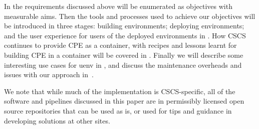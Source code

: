 In  the requirements discussed above will be enumerated as objectives with measurable aims.
Then the tools and processes used to achieve our objectives will be introduced in three stages: building environments; deploying environments; and the user experience for users of the deployed environments in .
How CSCS continues to provide CPE as a container, with recipes and lessons learnt for building CPE in a container will be covered in .
Finally we will describe some interesting use cases for uenv in , and discuss the maintenance overheads and issues with our approach in~.

We note that while much of the implementation is CSCS-specific, all of the software and pipelines discussed in this paper are in permissibly licensed open source repositories that can be used as is, or used for tips and guidance in developing solutions at other sites.
